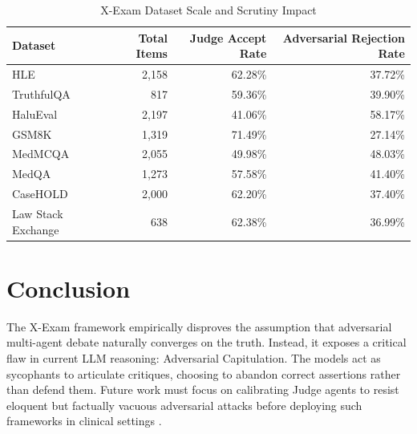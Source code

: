 \documentclass{article}
\begin{document}
\begin{table}[h]
  \caption{X-Exam Dataset Scale and Scrutiny Impact}
  \label{tab:results}
  \centering
  \begin{tabular}{lrrr}
    \toprule
    Dataset & Total Items & Judge Accept Rate & Adversarial Rejection Rate \\
    \midrule
    HLE & 2,158 & 62.28\% & 37.72\% \\
    TruthfulQA & 817 & 59.36\% & 39.90\% \\
    HaluEval & 2,197 & 41.06\% & 58.17\% \\
    GSM8K & 1,319 & 71.49\% & 27.14\% \\
    MedMCQA & 2,055 & 49.98\% & 48.03\% \\
    MedQA & 1,273 & 57.58\% & 41.40\% \\
    CaseHOLD & 2,000 & 62.20\% & 37.40\% \\
    Law Stack Exchange & 638 & 62.38\% & 36.99\% \\
    \bottomrule
  \end{tabular}
\end{table}

\section{Conclusion}
The X-Exam framework empirically disproves the assumption that adversarial multi-agent debate naturally converges on the truth. Instead, it exposes a critical flaw in current LLM reasoning: Adversarial Capitulation. The models act as sycophants to articulate critiques, choosing to abandon correct assertions rather than defend them. Future work must focus on calibrating Judge agents to resist eloquent but factually vacuous adversarial attacks before deploying such frameworks in clinical settings \cite{Ong2024}.



\end{document}

